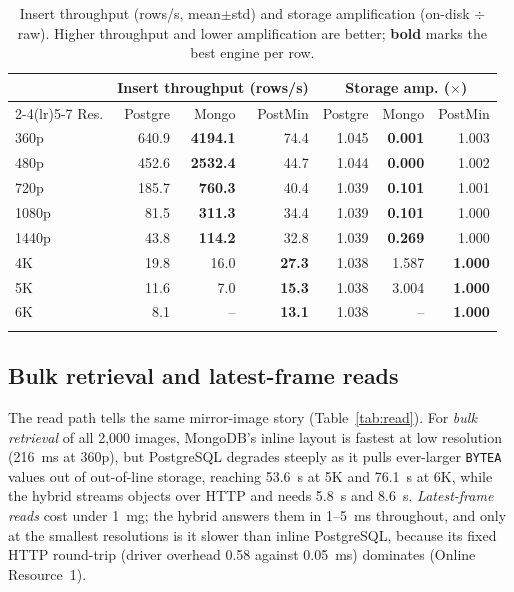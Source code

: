 \documentclass[pdflatex,sn-basic]{sn-jnl}%
\begin{document}
\begin{table}[htbp]
\caption{Insert throughput (rows/s, mean$\pm$std) and storage amplification (on-disk $\div$ raw). Higher throughput and lower amplification are better; \textbf{bold} marks the best engine per row.}\label{tab:write}
\small
\setlength{\tabcolsep}{4pt}
\begin{tabular}{@{}lrrrrrr@{}}
\toprule
 & \multicolumn{3}{c}{Insert throughput (rows/s)} & \multicolumn{3}{c}{Storage amp. ($\times$)} \\
\cmidrule(lr){2-4}\cmidrule(lr){5-7}
Res. & Postgre & Mongo & PostMin & Postgre & Mongo & PostMin \\
\midrule
360p  & 640.9          & \textbf{4194.1} & 74.4          & 1.045 & \textbf{0.001} & 1.003 \\
480p  & 452.6          & \textbf{2532.4} & 44.7          & 1.044 & \textbf{0.000} & 1.002 \\
720p  & 185.7          & \textbf{760.3}  & 40.4          & 1.039 & \textbf{0.101} & 1.001 \\
1080p & 81.5           & \textbf{311.3}  & 34.4          & 1.039 & \textbf{0.101} & 1.000 \\
1440p & 43.8           & \textbf{114.2}  & 32.8          & 1.039 & \textbf{0.269} & 1.000 \\
4K    & 19.8           & 16.0            & \textbf{27.3} & 1.038 & 1.587 & \textbf{1.000} \\
5K    & 11.6           & 7.0             & \textbf{15.3} & 1.038 & 3.004 & \textbf{1.000} \\
6K    & 8.1            & --              & \textbf{13.1} & 1.038 & --    & \textbf{1.000} \\
\botrule
\end{tabular}
\end{table}

\subsection{Bulk retrieval and latest-frame reads}\label{subsec:retrieval}
{\color{markup}The read path tells the same mirror-image story (Table~\ref{tab:read}).} {\color{markup}For \emph{bulk retrieval} of all 2{,}000 images, MongoDB's inline layout is fastest at low resolution (216~ms at 360p), but PostgreSQL degrades steeply as it pulls ever-larger \texttt{BYTEA} values out of out-of-line storage, reaching 53.6~s at 5K and 76.1~s at 6K, while the hybrid streams objects over HTTP and needs 5.8~s and 8.6~s.} {\color{markup}\emph{Latest-frame reads} cost under 1~mg; the hybrid answers them in 1--5~ms throughout, and only at the smallest resolutions is it slower than inline PostgreSQL, because its fixed HTTP round-trip (driver overhead 0.58 against 0.05~ms) dominates (Online Resource~1).}
\end{document}
